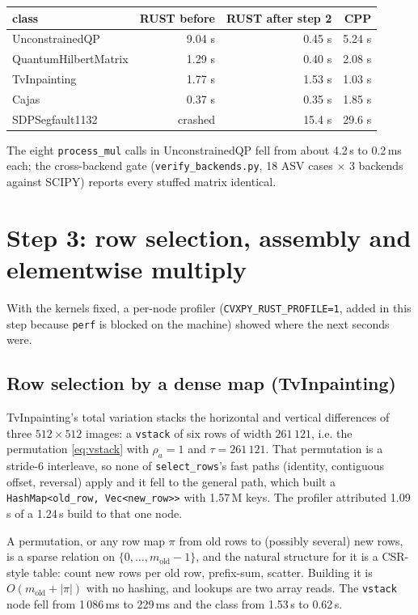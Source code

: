 \documentclass[11pt,a4paper]{article}
\newcommand{\code}[1]{\texttt{#1}}
\begin{document}
\begin{center}
\begin{tabular}{lrrr}
\toprule
class & RUST before & RUST after step 2 & CPP \\
\midrule
UnconstrainedQP & 9.04 s & 0.45 s & 5.24 s \\
QuantumHilbertMatrix & 1.29 s & 0.40 s & 2.08 s \\
TvInpainting & 1.77 s & 1.53 s & 1.03 s \\
Cajas & 0.37 s & 0.35 s & 1.85 s \\
SDPSegfault1132 & crashed & 15.4 s & 29.6 s \\
\bottomrule
\end{tabular}
\end{center}
The eight \code{process\_mul} calls in UnconstrainedQP fell from about 4.2\,s to 0.2\,ms each; the
cross-backend gate (\code{verify\_backends.py}, 18 ASV cases $\times$ 3 backends against SCIPY) reports
every stuffed matrix identical.

\section{Step 3: row selection, assembly and elementwise multiply}
\label{sec:assembly}

With the kernels fixed, a per-node profiler (\code{CVXPY\_RUST\_PROFILE=1}, added in this step because
\code{perf} is blocked on the machine) showed where the next seconds were.

\subsection{Row selection by a dense map (TvInpainting)}

TvInpainting's total variation stacks the horizontal and vertical differences of three
$512\times512$ images: a \code{vstack} of six rows of width $261\,121$, i.e. the permutation
\eqref{eq:vstack} with $\rho_a=1$ and $\tau = 261\,121$. That permutation is a stride-6 interleave,
so none of \code{select\_rows}'s fast paths (identity, contiguous offset, reversal) apply and it fell
to the general path, which built a \code{HashMap<old\_row, Vec<new\_row>>} with 1.57\,M keys. The
profiler attributed 1.09\,s of a 1.24\,s build to that one node.

A permutation, or any row map $\pi$ from old rows to (possibly several) new rows, is a sparse relation
on $\{0,\dots,m_{\text{old}}-1\}$, and the natural structure for it is a CSR-style table: count new
rows per old row, prefix-sum, scatter. Building it is $O(m_{\text{old}} + |\pi|)$ with no hashing,
and lookups are two array reads. The \code{vstack} node fell from 1\,086\,ms to 229\,ms and the class
from 1.53\,s to 0.62\,s.
\end{document}
